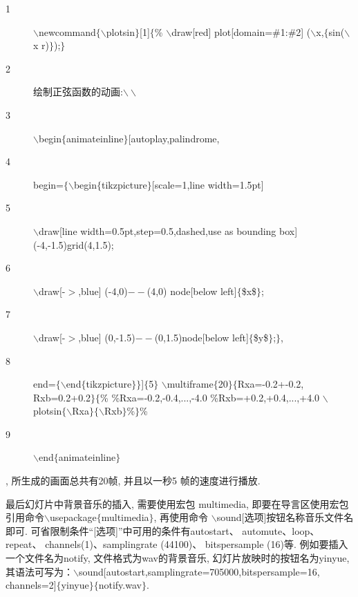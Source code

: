 \begin{description}
   \item[1]$\backslash$newcommand$\{\backslash$plotsin$\}$[1]$\{$\%
	   $\backslash$draw[red] plot[domain=\#1:\#2]
	 ($\backslash$x,$\{$sin($\backslash$x r)$\}$);$\}$
   \item[2] 绘制正弦函数的动画:$\backslash\backslash$
   \item[3]$\backslash$begin$\{$animateinline$\}$[autoplay,palindrome,
   \item[4]  begin=$\{\backslash$begin$\{$tikzpicture$\}$[scale=1,line width=1.5pt]
   \item[5]$\backslash$draw[line width=0.5pt,step=0.5,dashed,use as bounding box] (-4,-1.5)grid(4,1.5);
   \item[6]$\backslash$draw[-$>$,blue] (-4,0)$--$(4,0) node[below left]$\{$\$x\$$\}$;
   \item[7]$\backslash$draw[-$>$,blue] (0,-1.5)$--$(0,1.5)node[below left]$\{$\$y\$$\}$;$\}$,
   \item[8] end=$\{\backslash$end$\{$tikzpicture$\}\}$]$\{$5$\}$
           $\backslash$multiframe$\{$20$\}\{$Rxa=-0.2+-0.2, Rxb=0.2+0.2$\}\{$\%
        \%Rxa=-0.2,-0.4,...,-4.0
        \%Rxb=+0.2,+0.4,...,+4.0
        $\backslash$plotsin$\{\backslash$Rxa$\}\{\backslash$Rxb$\}$\%$\}$\%
   \item[9]$\backslash$end$\{$animateinline$\}$
 \end{description}

, 所生成的画面总共有20帧, 并且以一秒5 帧的速度进行播放.


最后幻灯片中背景音乐的插入, 需要使用宏包 multimedia, 即要在导言区使用宏包引用命令$\backslash$usepackage$\{$multimedia$\}$, 再使用命令
$\backslash$sound[选项]{按钮名称}{音乐文件名}即可. 可省限制条件“[选项]”中可用的条件有autostart、 automute、loop、repeat、
channels(1)、samplingrate (44100)、 bitspersample (16)等.
例如要插入一个文件名为notify, 文件格式为wav的背景音乐, 幻灯片放映时的按钮名为yinyue, 其语法可写为：$\backslash$sound[autostart,samp\-lingrate=705000,bitspersample=16,
channels=2]$\{$yinyue$\}\{$notify.wav$\}$.

